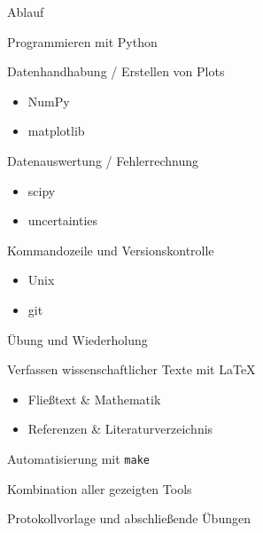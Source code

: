 \begin{frame}{Ablauf}
  \begin{description}
    \item[Montag] Programmieren mit Python
    \item[Dienstag] Datenhandhabung / Erstellen von Plots
      \begin{itemize}
        \item NumPy
        \item matplotlib
      \end{itemize}
    \item[Mittwoch] Datenauswertung / Fehlerrechnung
      \begin{itemize}
        \item scipy
        \item uncertainties
      \end{itemize}
    \item[Donnerstag] Kommandozeile und Versionskontrolle
      \begin{itemize}
        \item Unix
        \item git
      \end{itemize}
    \item[Freitag] Übung und Wiederholung
    \item[Nächste Woche] Verfassen wissenschaftlicher Texte mit \LaTeX{}
      \begin{itemize}
        \item Fließtext \& Mathematik
        \item Referenzen \& Literaturverzeichnis
      \end{itemize}
      \item Automatisierung mit \texttt{make}
      \item Kombination aller gezeigten Tools
      \item Protokollvorlage und abschließende Übungen
  \end{description}
\end{frame}
